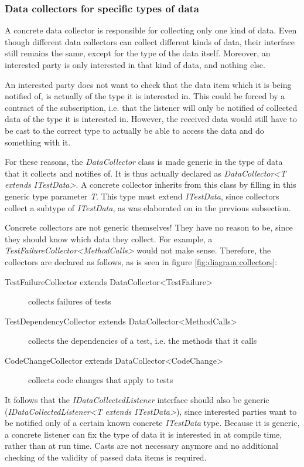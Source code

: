 \documentclass[i2]{oss}
\newcommand{\class}[1]{\emph{#1}}
\begin{document}
\subsubsection{Data collectors for specific types of data}

A concrete data collector is responsible for collecting only one kind of data.
Even though different data collectors can collect different kinds of data, their interface still remains the same, except for the type of the data itself. 
Moreover, an interested party is only interested in that kind of data, and nothing else.

An interested party does not want to check that the data item which it is being notified of, is actually of the type it is interested in.
This could be forced by a contract of the subscription, i.e. that the listener will only be notified of collected data of the type it is interested in.
However, the received data would still have to be cast to the correct type to actually be able to access the data and do something with it.

For these reasons, the \class{DataCollector} class is made generic in the type of data that it collects and notifies of.
It is thus actually declared as \class{DataCollector<T extends ITestData>}.
A concrete collector inherits from this class by filling in this generic type parameter \class{T}.
This type must extend \class{ITestData}, since collectors collect a subtype of \class{ITestData}, as was elaborated on in the previous subsection.

Concrete collectors are not generic themselves!
They have no reason to be, since they should know which data they collect.
For example, a \class{TestFailureCollector<MethodCalls>} would not make sense.
Therefore, the collectors are declared as follows, as is seen in figure \ref{fig:diagram:collectors}:
\begin{description}
\item[TestFailureCollector extends DataCollector<TestFailure>] collects failures of tests
\item[TestDependencyCollector extends DataCollector<MethodCalls>] collects the dependencies of a test, i.e. the methods that it calls
\item[CodeChangeCollector extends DataCollector<CodeChange>] collects code changes that apply to tests
\end{description}

It follows that the \class{IDataCollectedListener} interface should also be generic (\class{IDataCollectedListener<T extends ITestData>}), since interested parties want to be notified only of a certain known concrete \class{ITestData} type.
Because it is generic, a concrete listener can fix the type of data it is interested in at compile time, rather than at run time. Casts are not necessary anymore and no additional checking of the validity of passed data items is required.
\end{document}
